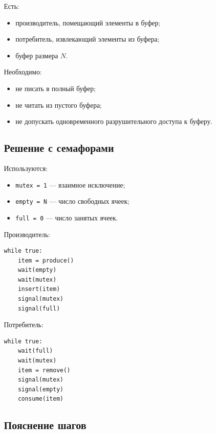 \documentclass[12pt,a4paper]{article}
\begin{document}
Есть:
\begin{itemize}
    \item производитель, помещающий элементы в буфер;
    \item потребитель, извлекающий элементы из буфера;
    \item буфер размера $N$.
\end{itemize}

Необходимо:
\begin{itemize}
    \item не писать в полный буфер;
    \item не читать из пустого буфера;
    \item не допускать одновременного разрушительного доступа к буферу.
\end{itemize}

\subsection{Решение с семафорами}

Используются:
\begin{itemize}
    \item \texttt{mutex = 1} --- взаимное исключение;
    \item \texttt{empty = N} --- число свободных ячеек;
    \item \texttt{full = 0} --- число занятых ячеек.
\end{itemize}

Производитель:

\begin{lstlisting}
while true:
    item = produce()
    wait(empty)
    wait(mutex)
    insert(item)
    signal(mutex)
    signal(full)
\end{lstlisting}

Потребитель:

\begin{lstlisting}
while true:
    wait(full)
    wait(mutex)
    item = remove()
    signal(mutex)
    signal(empty)
    consume(item)
\end{lstlisting}

\subsection{Пояснение шагов}
\end{document}
